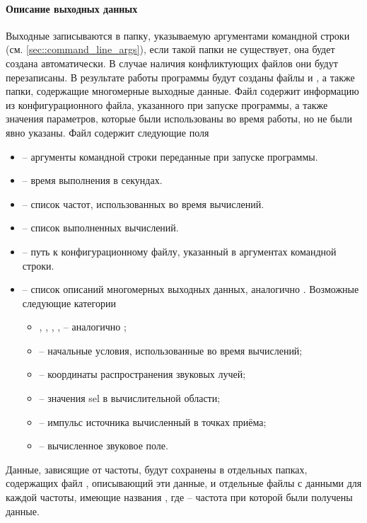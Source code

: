 \documentclass[../document.tex]{subfiles}
\begin{document}
                \paragraph{Описание выходных данных}
                    \par Выходные записываются в папку, указываемую аргументами командной строки (см. \ref{sec::command_line_args}), если такой папки не существует, она будет создана автоматически. В случае наличия конфликтующих файлов они будут перезаписаны. В результате работы программы будут созданы файлы  и , а также папки, содержащие многомерные выходные данные. Файл  содержит информацию из конфигурационного файла, указанного при запуске программы, а также значения параметров, которые были использованы во время работы, но не были явно указаны. Файл  содержит следующие поля
                    \begin{itemize}
                        \item{} -- аргументы командной строки переданные при запуске программы.
                        \item{} -- время выполнения в секундах.
                        \item{} -- список частот, использованных во время вычислений.
                        \item{} -- список выполненных вычислений.
                        \item{} -- путь к конфигурационному файлу, указанный в аргументах командной строки.
                        \item{} -- список описаний многомерных выходных данных, аналогично \hyperref[misc::input_data]{}. Возможные следующие категории
                            \begin{itemize}
                                \item{}, , , ,  -- аналогично \hyperref[misc::input_data]{};
                                \item{} -- начальные условия, использованные во время вычислений;
                                \item{} -- координаты распространения звуковых лучей;
                                \item{} -- значения \acrshort{sel} в вычислительной области;
                                \item{} -- импульс источника вычисленный в точках приёма;
                                \item{} -- вычисленное звуковое поле.
                            \end{itemize}
                    \end{itemize}
                    Данные, зависящие от частоты, будут сохранены в отдельных папках, содержащих файл , описывающий эти данные, и отдельные файлы с данными для каждой частоты, имеющие названия , где  -- частота при которой были получены данные.
\end{document}
